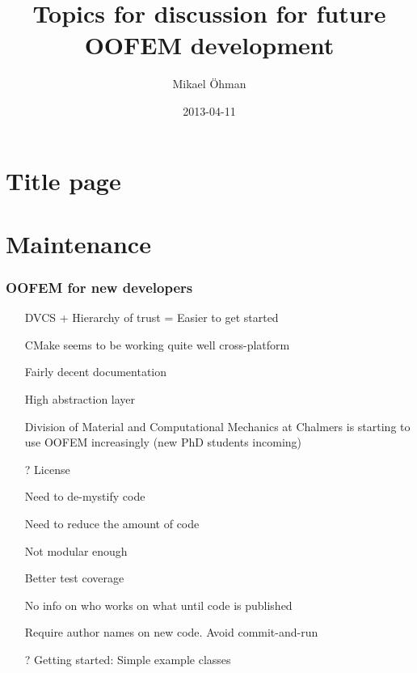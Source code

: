 \documentclass[11pt]{beamer} %
\title{Topics for discussion for future OOFEM development}
\author[Mikael \"Ohman]{Mikael \"Ohman}
\institute{Department of Applied Mechanics\\ Chalmers University of Technology}
\date{2013-04-11}
\begin{document}
\section{Title page}
\begin{frame}[plain]
 \titlepage
\end{frame}

\section{Maintenance}
\begin{frame}
 \frametitle{OOFEM for new developers}
\begin{itemize}
 \item[\smiley] DVCS + Hierarchy of trust = Easier to get started
 \item[\smiley] CMake seems to be working quite well cross-platform
 \item[\smiley] Fairly decent documentation
 \item[\smiley] High abstraction layer
 \item[\smiley] Division of Material and Computational Mechanics at Chalmers is starting to use OOFEM increasingly (new PhD students incoming)
 \item[?] License
\end{itemize}
\begin{itemize}
 \item[\frownie] Need to de-mystify code
 \item[\frownie] Need to reduce the amount of code
 \item[\frownie] Not modular enough
 \item[\frownie] Better test coverage
 \item[\frownie] No info on who works on what until code is published
 \item[\frownie] Require author names on new code. Avoid commit-and-run
 \item[?] Getting started: Simple example classes
\end{itemize}
\end{frame}
\end{document}

